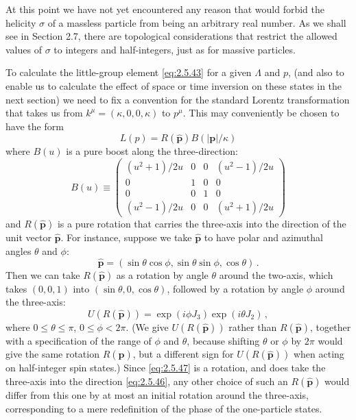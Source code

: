 At this point we have not yet encountered any reason that would forbid the
helicity $\sigma$ of a massless particle from being an arbitrary real number.
As we shall see in Section 2.7, there are topological considerations that
restrict the allowed values of $\sigma$ to integers and half-integers, just as
for massive particles.

To calculate the little-group element \eqref{eq:2.5.43} for a given $\Lambda$ and $p$,
(and also to enable us to calculate the effect of space or time inversion on
these states in the next section) we need to fix a convention for the standard
Lorentz transformation that takes us from
$k^\mu=(\kappa,0,0,\kappa)$ to $p^\mu$. This may conveniently be chosen to have
the form
\begin{equation}
L(p)=R(\hat{\mathbf{p}})B(|\mathbf{p}|/\kappa)
\tag{2.5.44}\label{eq:2.5.44}
\end{equation}
where $B(u)$ is a pure boost along the three-direction:
\begin{equation}
B(u)\equiv
\begin{pmatrix}
(u^2+1)/2u&0&0&(u^2-1)/2u\\
0&1&0&0\\
0&0&1&0\\
(u^2-1)/2u&0&0&(u^2+1)/2u
\end{pmatrix}
\tag{2.5.45}\label{eq:2.5.45}
\end{equation}
and $R(\hat{\mathbf{p}})$ is a pure rotation that carries the three-axis into
the direction of the unit vector $\hat{\mathbf{p}}$. For instance, suppose we
take $\hat{\mathbf{p}}$ to have polar and azimuthal angles $\theta$ and $\phi$:
\begin{equation}
\hat{\mathbf{p}}=(\sin\theta\cos\phi,\sin\theta\sin\phi,\cos\theta)\,.
\tag{2.5.46}\label{eq:2.5.46}
\end{equation}
Then we can take $R(\hat{\mathbf{p}})$ as a rotation by angle $\theta$ around
the two-axis, which takes $(0,0,1)$ into $(\sin\theta,0,\cos\theta)$, followed
by a rotation by angle $\phi$ around the three-axis:
\begin{equation}
U(R(\hat{\mathbf{p}}))=\exp(i\phi J_3)\exp(i\theta J_2)\,,
\tag{2.5.47}\label{eq:2.5.47}
\end{equation}
where $0\leq\theta\leq\pi$, $0\leq\phi<2\pi$. (We give
$U(R(\hat{\mathbf{p}}))$ rather than $R(\hat{\mathbf{p}})$, together with a
specification of the range of $\phi$ and $\theta$, because shifting $\theta$
or $\phi$ by $2\pi$ would give the same rotation $R(\hat{\mathbf{p}})$, but a
different sign for $U(R(\hat{\mathbf{p}}))$ when acting on half-integer spin
states.) Since \eqref{eq:2.5.47} is a rotation, and does take the three-axis into the
direction \eqref{eq:2.5.46}, any other choice of such an $R(\hat{\mathbf{p}})$ would
differ from this one by at most an initial rotation around the three-axis,
corresponding to a mere redefinition of the phase of the one-particle states.

